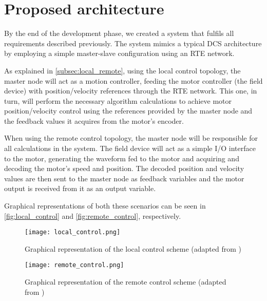 \section{Proposed architecture} \label{sec:proposed-arch}

By the end of the development phase, we created a system that fulfils all requirements described previously.
The system mimics a typical DCS architecture by employing a simple master-slave configuration using an RTE network.

As explained in \autoref{subsec:local_remote}, using the local control topology, the master node will act as a motion controller, feeding the motor controller (the field device) with position/velocity references through the RTE network.
This one, in turn, will perform the necessary algorithm calculations to achieve motor position/velocity control using the references provided by the master node and the feedback values it acquires from the motor's encoder.

When using the remote control topology, the master node will be responsible for all calculations in the system.
The field device will act as a simple I/O interface to the motor, generating the waveform fed to the motor and acquiring and decoding the motor's speed and position.
The decoded position and velocity values are then sent to the master node as feedback variables and the motor output is received from it as an output variable.

Graphical representations of both these scenarios can be seen in \autoref{fig:local_control} and \autoref{fig:remote_control}, respectively. 

\begin{figure}[htp]
	\centering
	\texttt{[image: local\_control.png]}
	\caption{Graphical representation of the local control scheme (adapted from \cite{rte:motion-control-over-rte})}
	\label{fig:local_control}
\end{figure}

\begin{figure}[htp]
	\centering
	\texttt{[image: remote\_control.png]}
	\caption{Graphical representation of the remote control scheme (adapted from \cite{rte:motion-control-over-rte})}
	\label{fig:remote_control}
\end{figure}





